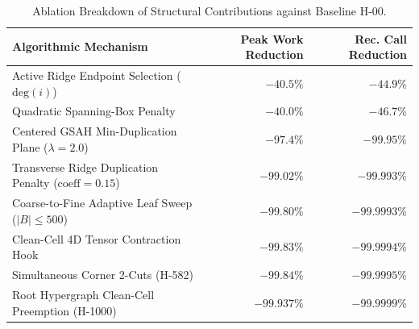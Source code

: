 \begin{table}[t]
\centering
\caption{Ablation Breakdown of Structural Contributions against Baseline H-00.}
\label{tab:ablation}
\small
\begin{tabular}{lrr}
\toprule
\textbf{Algorithmic Mechanism} & \textbf{Peak Work Reduction} & \textbf{Rec. Call Reduction} \\
\midrule
Active Ridge Endpoint Selection ($\mathrm{deg}(i)$) & $-40.5\%$ & $-44.9\%$ \\
Quadratic Spanning-Box Penalty & $-40.0\%$ & $-46.7\%$ \\
Centered GSAH Min-Duplication Plane ($\lambda = 2.0$) & $-97.4\%$ & $-99.95\%$ \\
Transverse Ridge Duplication Penalty ($\mathrm{coeff} = 0.15$) & $-99.02\%$ & $-99.993\%$ \\
Coarse-to-Fine Adaptive Leaf Sweep ($|B| \le 500$) & $-99.80\%$ & $-99.9993\%$ \\
Clean-Cell 4D Tensor Contraction Hook & $-99.83\%$ & $-99.9994\%$ \\
Simultaneous Corner 2-Cuts (H-582) & $-99.84\%$ & $-99.9995\%$ \\
Root Hypergraph Clean-Cell Preemption (H-1000) & $\mathbf{-99.937\%}$ & $\mathbf{-99.9999\%}$ \\
\bottomrule
\end{tabular}
\end{table}